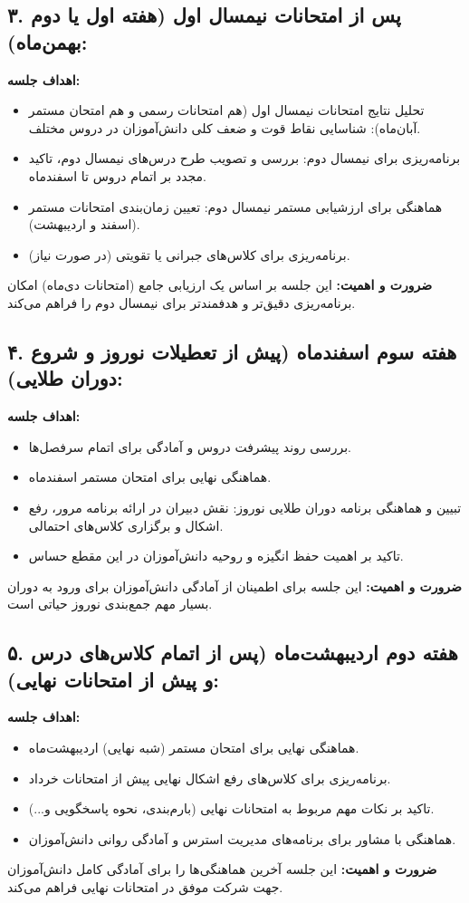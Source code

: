 \documentclass[a4paper,14pt]{article}
\begin{document}
\subsection*{۳. پس از امتحانات نیمسال اول (هفته اول یا دوم بهمن‌ماه):}
\textbf{اهداف جلسه:}
\begin{itemize}
    \item تحلیل نتایج امتحانات نیمسال اول (هم امتحانات رسمی و هم امتحان مستمر آبان‌ماه): شناسایی نقاط قوت و ضعف کلی دانش‌آموزان در دروس مختلف.
    \item برنامه‌ریزی برای نیمسال دوم: بررسی و تصویب طرح درس‌های نیمسال دوم، تاکید مجدد بر اتمام دروس تا اسفندماه.
    \item هماهنگی برای ارزشیابی مستمر نیمسال دوم: تعیین زمان‌بندی امتحانات مستمر (اسفند و اردیبهشت).
    \item برنامه‌ریزی برای کلاس‌های جبرانی یا تقویتی (در صورت نیاز).
\end{itemize}
\textbf{ضرورت و اهمیت:} این جلسه بر اساس یک ارزیابی جامع (امتحانات دی‌ماه) امکان برنامه‌ریزی دقیق‌تر و هدفمندتر برای نیمسال دوم را فراهم می‌کند.
\medskip
\subsection*{۴. هفته سوم اسفندماه (پیش از تعطیلات نوروز و شروع دوران طلایی):}
\textbf{اهداف جلسه:}
\begin{itemize}
    \item بررسی روند پیشرفت دروس و آمادگی برای اتمام سرفصل‌ها.
    \item هماهنگی نهایی برای امتحان مستمر اسفندماه.
    \item تبیین و هماهنگی برنامه دوران طلایی نوروز: نقش دبیران در ارائه برنامه مرور، رفع اشکال و برگزاری کلاس‌های احتمالی.
    \item تاکید بر اهمیت حفظ انگیزه و روحیه دانش‌آموزان در این مقطع حساس.
\end{itemize}
\textbf{ضرورت و اهمیت:} این جلسه برای اطمینان از آمادگی دانش‌آموزان برای ورود به دوران بسیار مهم جمع‌بندی نوروز حیاتی است.
\medskip
\subsection*{۵. هفته دوم اردیبهشت‌ماه (پس از اتمام کلاس‌های درس و پیش از امتحانات نهایی):}
\textbf{اهداف جلسه:}
\begin{itemize}
    \item هماهنگی نهایی برای امتحان مستمر (شبه نهایی) اردیبهشت‌ماه.
    \item برنامه‌ریزی برای کلاس‌های رفع اشکال نهایی پیش از امتحانات خرداد.
    \item تاکید بر نکات مهم مربوط به امتحانات نهایی (بارم‌بندی، نحوه پاسخگویی و...).
    \item هماهنگی با مشاور برای برنامه‌های مدیریت استرس و آمادگی روانی دانش‌آموزان.
\end{itemize}
\textbf{ضرورت و اهمیت:} این جلسه آخرین هماهنگی‌ها را برای آمادگی کامل دانش‌آموزان جهت شرکت موفق در امتحانات نهایی فراهم می‌کند.
\bigskip
\end{document}
